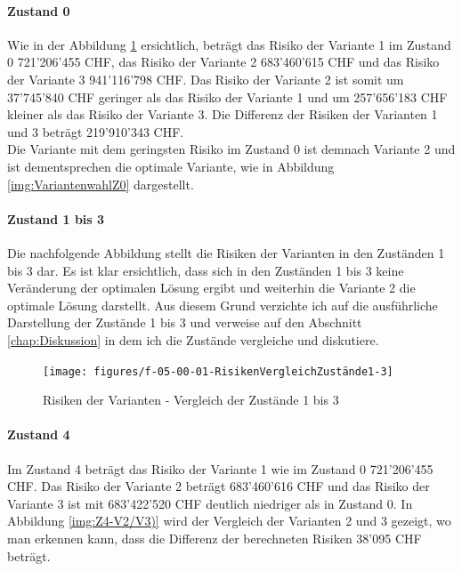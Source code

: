 \paragraph{Zustand 0}

Wie in der Abbildung \ref{img:RisikovergleichVarianten} ersichtlich, beträgt das Risiko der Variante 1 im Zustand 0 721'206'455 CHF, das Risiko der Variante 2 683'460'615 CHF und das Risiko der Variante 3 941'116'798 CHF. Das Risiko der Variante 2 ist somit um 37'745'840 CHF geringer als das Risiko der Variante 1 und um 257'656'183 CHF kleiner als das Risiko der Variante 3. Die Differenz der Risiken der Varianten 1 und 3 beträgt 219'910'343 CHF. \\
Die Variante mit dem geringsten Risiko im Zustand 0 ist demnach Variante 2 und ist dementsprechen die optimale Variante, wie in Abbildung \ref{img:VariantenwahlZ0} dargestellt.

\paragraph{Zustand 1 bis 3}

Die nachfolgende Abbildung stellt die Risiken der Varianten in den Zuständen 1 bis 3 dar. Es ist klar ersichtlich, dass sich in den Zuständen 1 bis 3 keine Veränderung der optimalen Lösung ergibt und weiterhin die Variante 2 die optimale Lösung darstellt. Aus diesem Grund verzichte ich auf die ausführliche Darstellung der Zustände 1 bis 3 und verweise auf den Abschnitt \ref{chap:Diskussion} in dem ich die Zustände vergleiche und diskutiere.

\begin{figure}[h!]
	\centering
	\texttt{[image: figures/f-05-00-01-RisikenVergleichZustände1-3]}
	\caption[Risikovergleich der Zustände 1 bis 4]{Risiken der Varianten - Vergleich der Zustände 1 bis 3}
	\label{img:RisikovergleichVarianten}
\end{figure}

\paragraph{Zustand 4}

Im Zustand 4 beträgt das Risiko der Variante 1 wie im Zustand 0 721'206'455 CHF. Das Risiko der Variante 2 beträgt 683'460'616 CHF und das Risiko der Variante 3 ist mit 683'422'520 CHF deutlich niedriger als in Zustand 0. In Abbildung \ref{img:Z4-V2/V3)} wird der Vergleich der Varianten 2 und 3 gezeigt, wo man erkennen kann, dass die Differenz der berechneten Risiken 38'095 CHF beträgt.

